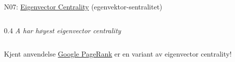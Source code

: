 \documentclass[aspectratio=169, 10pt]{beamer}
\begin{document}
\begin{frame}{N07: \href{https://en.wikipedia.org/wiki/Eigenvector_centrality}{Eigenvector Centrality} (egenvektor-sentralitet)}
\begin{columns}
\begin{column}{0.4\textwidth}
            \textit{A har høyest eigenvector centrality}
        \end{column}
    \end{columns}
    
    \vspace{1mm}
    
    \begin{block}{\footnotesize Kjent anvendelse}
        \footnotesize \href{https://en.wikipedia.org/wiki/PageRank}{Google PageRank} er en variant av eigenvector centrality!
    \end{block}
    
\end{frame}

\end{document}

